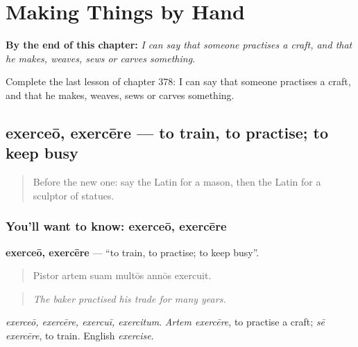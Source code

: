 
\chapter{Making Things by Hand}
\label{ch:la-making-things-by-hand}

\begin{chapteropening}
\textbf{By the end of this chapter:} \emph{I can say that someone practises a craft, and that he makes, weaves, sews or carves something.}

Complete the last lesson of chapter 378: I can say that someone practises a craft, and that he makes, weaves, sews or carves something.
\end{chapteropening}

\section[exerceō, exercēre]{exerceō, exercēre — to train, to practise; to keep busy}

\label{lesson:LA-C378-exerceo}



\begin{quote}
Before the new one: say the Latin for a mason, then the Latin for a sculptor of statues.
\end{quote}

\subsection*{You'll want to know: exerceō, exercēre}
\textbf{exerceō, exercēre} — \textquotedblleft{}to train, to practise; to keep busy\textquotedblright{}.

\begin{quote}
Pistor artem suam multōs annōs exercuit.
\end{quote}

\begin{quote}
\emph{The baker practised his trade for many years.}
\end{quote}

\emph{exerceō, exercēre, exercuī, exercitum}. \emph{Artem exercēre}, to practise a craft; \emph{sē exercēre}, to train. English \emph{exercise}.

